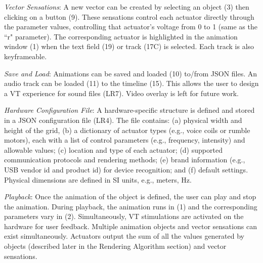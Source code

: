 \emph{Vector Sensations}:  
A new vector can be created by selecting an object (3) then clicking on a button (9).
These sensations control each actuator directly through the parameter values, controlling that actuator's voltage from 0 to 1 (same as the ``r" parameter).
The corresponding actuator is highlighted in the animation window (1) when the text field (19) or track (17C) is selected.
Each track is also keyframeable.

\emph{Save and Load}: 
Animations can be saved and loaded (10) to/from JSON files.
An audio track can be loaded (11) to the timeline (15).%
This allows the user to design a VT experience for sound files (LR7).
Video overlay is left for future work.%

\emph{Hardware Configuration File}:  A hardware-specific structure is defined and stored in a JSON configuration file (LR4). The file contains:
(a) physical width and height of the grid, %
(b) a dictionary of actuator types (e.g., voice coils or rumble motors), each with a list of control parameters (e.g., frequency, intensity) and allowable values;
(c) location and type of each actuator;
(d) supported communication protocols and rendering methods;
(e) brand information (e.g., USB vendor id and product id) for device recognition; and
(f) default settings.
Physical dimensions are defined in SI units, e.g., meters, Hz. 

\emph{Playback}: Once the animation of the object is defined,
the user can play and stop the animation. %
During playback, the animation runs in (1) and the corresponding parameters vary in (2).  
Simultaneously, VT stimulations are activated on the hardware for user feedback.
Multiple animation objects and vector sensations can exist simultaneously.
Actuators output the sum of all the values generated by objects (described later in the Rendering Algorithm section) and vector sensations.

